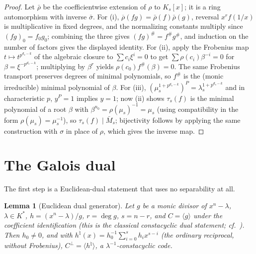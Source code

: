 \documentclass[10pt,journal,draftclsnofoot,onecolumn]{IEEEtran}
\newtheorem{lemma}[theorem]{Lemma}
\theoremstyle{definition}
\theoremstyle{remark}
\begin{document}
\begin{proof}
Let \(\bar\rho\) be the coefficientwise extension of \(\rho\) to
\(K_s[x]\); it is a ring automorphism with inverse \(\bar\sigma\).
For (i), \(\overline\rho(fg) = \bar\rho(f)\bar\rho(g)\), reversal
\(x^{r}f(1/x)\) is multiplicative in fixed degrees, and the normalizing
constants multiply since \((fg)_0 = f_0 g_0\); combining the three gives
\((fg)^{\#} = f^{\#} g^{\#}\), and induction on the number of factors
gives the displayed identity. For (ii), apply the Frobenius map
\(t \mapsto t^{p^{d_s-k}}\) of the algebraic closure to
\(\sum c_i \xi^i = 0\) to get \(\sum \rho(c_i) \beta^{-i} = 0\) for
\(\beta = \xi^{-p^{d_s-k}}\); multiplying by \(\beta^r\) yields
\(\rho(c_0) f^{\#}(\beta) = 0\). The same Frobenius transport preserves
degrees of minimal polynomials, so \(f^{\#}\) is the (monic irreducible)
minimal polynomial of \(\beta\). For (iii),
\((\mu_s^{1+p^{d_s-k}})^P = \lambda_s^{1+p^{d_s-k}}\) and in
characteristic \(p\), \(y^P = 1\) implies \(y = 1\); now (ii) shows
\(\tau_s(f)\) is the minimal polynomial of a root \(\beta\) with
\(\beta^{n_0} = \rho(\mu_s)^{-1} = \mu_s\) (using compatibility in the
form \(\rho(\mu_s) = \mu_s^{-1}\)), so \(\tau_s(f) \mid \bar M_s\);
bijectivity follows by applying the same construction with \(\sigma\) in
place of \(\rho\), which gives the inverse map.
\end{proof}

\section{The Galois dual}\label{sec:dual}

The first step is a Euclidean-dual statement that uses no separability
at all.

\begin{lemma}[Euclidean dual generator]\label{lem:RR3}
Let \(g\) be a monic divisor of \(x^n - \lambda\), \(\lambda \in K^*\),
\(h = (x^n-\lambda)/g\), \(r = \deg g\), \(s = n - r\), and
\(C = \langle g \rangle\) under the coefficient identification (this is
the classical constacyclic dual statement;
cf.~\cite{HP2003, MS1977}). Then
\(h_0 \ne 0\), and with
\(h^{\natural}(x) = h_0^{-1} \sum_{i=0}^{s} h_i x^{s-i}\) (the ordinary
reciprocal, without Frobenius),
\(C^\perp = \langle h^{\natural} \rangle\), a \(\lambda^{-1}\)-constacyclic
code.
\end{lemma}
\end{document}
